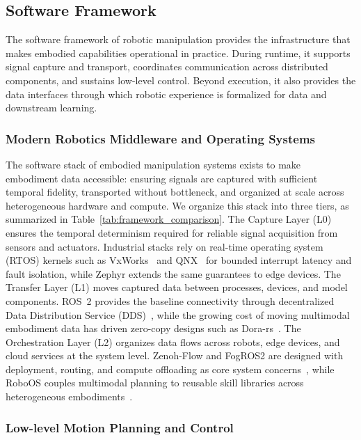 \documentclass[acmsmall,screen,review]{acmart}
\begin{document}
\subsection{Software Framework}\label{sec:embodiment_software}

The software framework of robotic manipulation provides the infrastructure that makes embodied capabilities operational in practice.
During runtime, it supports signal capture and transport, coordinates communication across distributed components, and sustains low-level control. 
Beyond execution, it also provides the data interfaces through which robotic experience is formalized for data and downstream learning.

\subsubsection{Modern Robotics Middleware and Operating Systems}\label{subsec:control_middleware}

The software stack of embodied manipulation systems exists to make embodiment data accessible: ensuring signals are captured with sufficient temporal fidelity, transported without bottleneck, and organized at scale across heterogeneous hardware and compute.
We organize this stack into three tiers, as summarized in Table~\ref{tab:framework_comparison}. 
The Capture Layer (L0) ensures the temporal determinism required for reliable signal acquisition from sensors and actuators. 
Industrial stacks rely on real-time operating system (RTOS) kernels such as VxWorks~\cite{xu2014mpi} and QNX~\cite{dan1992architectural} for bounded interrupt latency and fault isolation, while Zephyr extends the same guarantees to edge devices.
The Transfer Layer (L1) moves captured data between processes, devices, and model components. 
ROS~2 provides the baseline connectivity through decentralized Data Distribution Service (DDS)~\cite{macenski2022robot}, while the growing cost of moving multimodal embodiment data has driven zero-copy designs such as Dora-rs~\cite{zhang2026dora}.
The Orchestration Layer (L2) organizes data flows across robots, edge devices, and cloud services at the system level. 
Zenoh-Flow and FogROS2 are designed with deployment, routing, and compute offloading as core system concerns~\cite{baldoni2023zenohflow, ichnowski2022fogros2}, while RoboOS couples multimodal planning to reusable skill libraries across heterogeneous embodiments~\cite{wang2025roboos}.

\subsubsection{Low-level Motion Planning and Control}\label{subsec:lowlevel_control}
\end{document}

